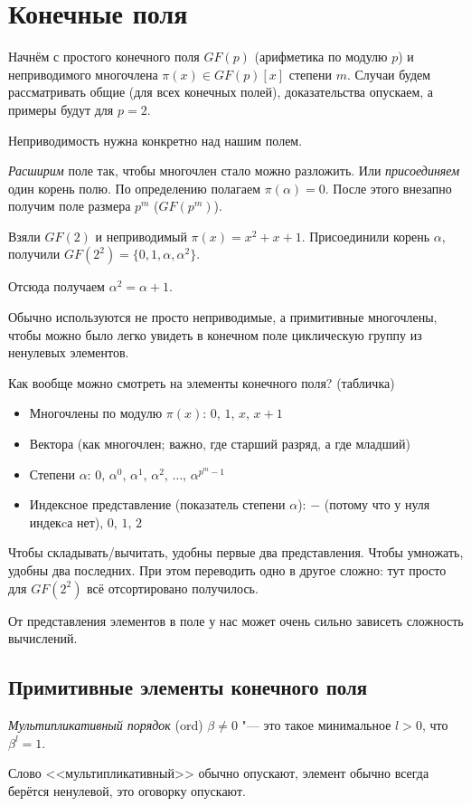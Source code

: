 \section{Конечные поля}
Начнём с простого конечного поля $GF(p)$ (арифметика по модулю $p$)
и неприводимого многочлена $\pi(x) \in GF(p)[x]$ степени $m$.
Случаи будем рассматривать общие (для всех конечных полей), доказательства опускаем,
а примеры будут для $p=2$.

\begin{Rem}
Неприводимость нужна конкретно над нашим полем.
\end{Rem}

\textit{Расширим} поле так, чтобы многочлен стало можно разложить.
Или \textit{присоединяем} один корень полю.
По определению полагаем $\pi(\alpha)=0$.
После этого внезапно получим поле размера $p^m$ ($GF(p^m)$).

\begin{exmp}
Взяли $GF(2)$ и неприводимый $\pi(x)=x^2+x+1$.
Присоединили корень $\alpha$, получили $GF(2^2)=\{0, 1, \alpha, \alpha^2\}$.

Отсюда получаем $\alpha^2=\alpha+1$.
\end{exmp}

\begin{Rem}
Обычно используются не просто неприводимые, а примитивные многочлены,
чтобы можно было легко увидеть в конечном поле циклическую группу
из ненулевых элементов.
\end{Rem}

Как вообще можно смотреть на элементы конечного поля? (табличка)
\begin{itemize}
\item Многочлены по модулю $\pi(x)$: $0$, $1$, $x$, $x+1$
\item Вектора (как многочлен; важно, где старший разряд, а где младший)
\item Степени $\alpha$: $0$, $\alpha^0$, $\alpha^1$, $\alpha^2$, $\dots$, $\alpha^{p^m-1}$
\item Индексное представление (показатель степени $\alpha$): $-$ (потому что у нуля индекcа нет), $0$, $1$, $2$
\end{itemize}
Чтобы складывать/вычитать, удобны первые два представления.
Чтобы умножать, удобны два последних.
При этом переводить одно в другое сложно: тут просто для $GF(2^2)$ всё отсортировано получилось.

От представления элементов в поле у нас может очень сильно зависеть сложность вычислений.

\subsection{Примитивные элементы конечного поля}
\begin{Def}
	\textit{Мультипликативный порядок} (ord) $\beta \neq 0$ "--- это
	такое минимальное $l>0$, что $\beta^l=1$.
\end{Def}
\begin{Rem}
	Слово <<мультипликативный>> обычно опускают, элемент
	обычно всегда берётся ненулевой, это оговорку опускают.
\end{Rem}

